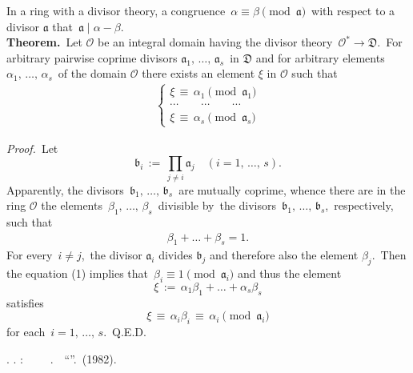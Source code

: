 \documentclass[12pt]{article}
\theoremstyle{definition}
\begin{document}
In a ring with a divisor theory, a congruence \,$\alpha \equiv \beta \pmod{\mathfrak{a}}$\, with respect to a divisor  $\mathfrak{a}$  that\, $\mathfrak{a} \mid \alpha\!-\!\beta$.\\


\textbf{Theorem.}\, Let $\mathcal{O}$ be an integral domain having the divisor theory \,$\mathcal{O}^* \to \mathfrak{D}$.\, For arbitrary pairwise coprime divisors $\mathfrak{a}_1,\,\ldots,\,\mathfrak{a}_s$\, in $\mathfrak{D}$ and for arbitrary elements \,$\alpha_1,\,\ldots,\,\alpha_s$\, of the domain $\mathcal{O}$ there exists an element $\xi$ in $\mathcal{O}$ such that
\begin{align*}
\begin{cases}
\xi\, \equiv\, \alpha_1 \pmod{\mathfrak{a}_1}\\
\cdots \qquad \cdots \qquad \cdots\\
\xi\, \equiv\, \alpha_s \pmod{\mathfrak{a}_s}
\end{cases}
\end{align*}


{\em Proof.}\, Let
$$\mathfrak{b}_i \,:=\, \prod_{j \neq i}\mathfrak{a}_j \quad (i = 1,\,\ldots,\,s).$$
Apparently, the divisors\, $\mathfrak{b}_1,\,\ldots,\,\mathfrak{b}_s$\, are mutually coprime, whence there are in the ring $\mathcal{O}$ the elements\, $\beta_1,\,\ldots,\,\beta_s$\, divisible by\, the divisors\, $\mathfrak{b}_1,\,\ldots,\,\mathfrak{b}_s$,\, respectively, such that 
\begin{align}
\beta_1+\ldots+\beta_s = 1.
\end{align}
For every\, $i \neq j$,\, the divisor $\mathfrak{a}_i$ divides $\mathfrak{b}_j$ and therefore also the element $\beta_j$.\, Then the equation (1) implies that\, $\beta_i \equiv 1 \pmod{\mathfrak{a}_i}$ and thus the element
$$\xi \,:=\, \alpha_1\beta_1+\ldots+\alpha_s\beta_s$$
satisfies
$$\xi \,\equiv\, \alpha_i\beta_i \,\equiv\, \alpha_i\! \pmod{\mathfrak{a}_i}$$
for each\, $i = 1,\,\ldots,\,s$.\, Q.E.D.
 


\begin{thebibliography}{9}
 \CYRM. \CYRM. \CYRP\cyro\cyrs\cyrt\cyrn\cyri\cyrk\cyro\cyrv: 
{\em \CYRV\cyrv\cyre\cyrd\cyre\cyrn\cyri\cyre\, \cyrv\, \cyrt\cyre\cyro\cyrr\cyri\cyryu\, \cyra\cyrl\cyrg\cyre\cyrb\cyrr\cyra\cyri\cyrch\cyre\cyrs\cyrk\cyri\cyrh \,
\cyrch\cyri\cyrs\cyre\cyrl}. \,\CYRI\cyrz\cyrd\cyra\cyrt\cyre\cyrl\cyrsftsn\cyrs\cyrt\cyrv\cyro \,
``\CYRN\cyra\cyru\cyrk\cyra''. \CYRM\cyro\cyrs\cyrk\cyrv\cyra \,(1982).
\end{thebibliography}

\end{document}
